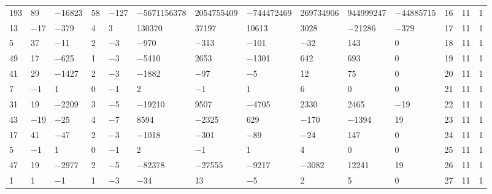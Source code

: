 \documentclass[pdftex]{sigma}
\numberwithin{equation}{section}
\theoremstyle{definition}
\numberwithin{table}{section}
\begin{document}
{\begin{paracol}{3}
\begin{supertabular}{|w{c}{.32cm}w{c}{.32cm}w{c}{.32cm}@{\hspace{.5cm}}w{c}{.2cm}w{c}{.2cm}|@{\hspace{\tabcolsep}}HHHHHHw{c}{.17cm}w{c}{.17cm}w{c}{.17cm}|}
			193 & 89 & $-$16823 & 58 & $-$127 & $-$5671156378 & 2054755409 & $-$744472469 & 269734906 & 944999247 & $-$44885715 & 16 & 11 & 1 \\
			13 & $-$17 & $-$379 & 4 & 3 & 130370 & 37197 & 10613 & 3028 & $-$21286 & $-$379 & 17 & 11 & 1 \\
			5 & 37 & $-$11 & 2 & $-$3 & $-$970 & $-$313 & $-$101 & $-$32 & 143 & 0 & 18 & 11 & 1 \\
			49 & 17 & $-$625 & 1 & $-$3 & $-$5410 & 2653 & $-$1301 & 642 & 693 & 0 & 19 & 11 & 1 \\
			41 & 29 & $-$1427 & 2 & $-$3 & $-$1882 & $-$97 & $-$5 & 12 & 75 & 0 & 20 & 11 & 1 \\
			7 & $-$1 & 1 & 0 & $-$1 & 2 & $-$1 & 1 & 6 & 0 & 0 & 21 & 11 & 1 \\
			31 & 19 & $-$2209 & 3 & $-$5 & $-$19210 & 9507 & $-$4705 & 2330 & 2465 & $-$19 & 22 & 11 & 1 \\
			43 & $-$19 & $-$25 & 4 & $-$7 & 8594 & $-$2325 & 629 & $-$170 & $-$1394 & 19 & 23 & 11 & 1 \\
			17 & 41 & $-$47 & 2 & $-$3 & $-$1018 & $-$301 & $-$89 & $-$24 & 147 & 0 & 24 & 11 & 1 \\
			5 & $-$1 & 1 & 0 & $-$1 & 2 & $-$1 & 1 & 4 & 0 & 0 & 25 & 11 & 1 \\
			47 & 19 & $-$2977 & 2 & $-$5 & $-$82378 & $-$27555 & $-$9217 & $-$3082 & 12241 & 19 & 26 & 11 & 1 \\
			1 & 1 & $-$1 & 1 & $-$3 & $-$34 & 13 & $-$5 & 2 & 5 & 0 & 27 & 11 & 1 \\ \hline
		\end{supertabular}
	\end{paracol}
	\vspace{-.2cm}
	\label{TA:det=1}
	\vspace{.5cm}
	
}
\end{document}
